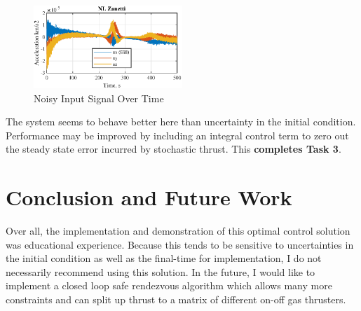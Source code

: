 \documentclass[conf]{new-aiaa}
\begin{document}
\begin{singlespace}
\begin{figure}[htpb!]
\label{fig:noise}
\end{figure}
\begin{figure}[!htbp] 
  \centering
  \includegraphics[width=0.5\textwidth]{figures/controls_noise.eps}
  \caption{Noisy Input Signal Over Time}
  \label{fig:unoise}
 \end{figure}


The system seems to behave better here than uncertainty in the initial condition. Performance may be improved by including an integral control term to zero out the steady state error incurred by stochastic thrust. This \textbf{completes Task 3}.


\section{Conclusion and Future Work}
Over all, the implementation and demonstration of this optimal control solution was educational experience. Because this tends to be sensitive to uncertainties in the initial condition as well as the final-time for implementation, I do not necessarily recommend using this solution. In the future, I would like to implement a closed loop safe rendezvous algorithm which allows many more constraints and can split up thrust to a matrix of different on-off gas thrusters.

\clearpage




% 
% 
% 
% 
% 
% 
% 


\end{singlespace}
\end{document}
